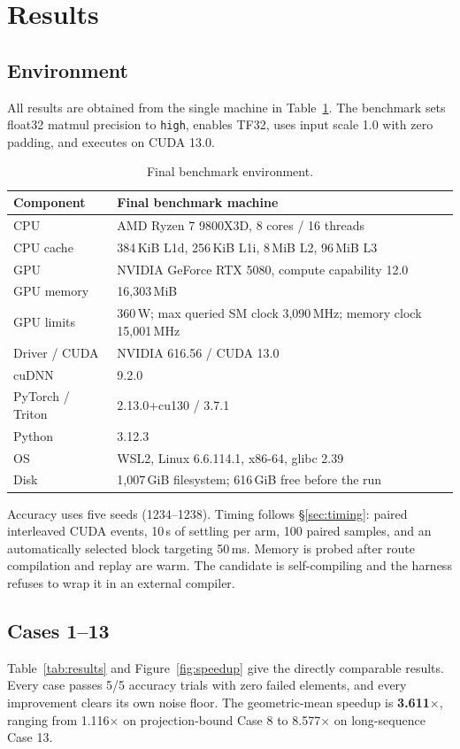 \documentclass[10pt,conference,compsoc]{IEEEtran}
\begin{document}
\section{Results}
\label{sec:results}

\subsection{Environment}
All results are obtained from the single machine in Table~\ref{tab:env}. The benchmark sets float32 matmul precision to \texttt{high}, enables TF32, uses input scale 1.0 with zero padding, and executes on CUDA 13.0.

\begin{table}[H]
\centering
\footnotesize
\begin{tabular}{p{2.1cm} p{5.4cm}}
\hline
\textbf{Component} & \textbf{Final benchmark machine} \\
\hline
CPU & AMD Ryzen 7 9800X3D, 8 cores / 16 threads \\
CPU cache & 384\,KiB L1d, 256\,KiB L1i, 8\,MiB L2, 96\,MiB L3 \\
GPU & NVIDIA GeForce RTX 5080, compute capability 12.0 \\
GPU memory & 16{,}303\,MiB \\
GPU limits & 360\,W; max queried SM clock 3{,}090\,MHz; memory clock 15{,}001\,MHz \\
Driver / CUDA & NVIDIA 616.56 / CUDA 13.0 \\
cuDNN & 9.2.0 \\
PyTorch / Triton & 2.13.0+cu130 / 3.7.1 \\
Python & 3.12.3 \\
OS & WSL2, Linux 6.6.114.1, x86-64, glibc 2.39 \\
Disk & 1{,}007\,GiB filesystem; 616\,GiB free before the run \\
\hline
\end{tabular}
\vspace{6pt}
\caption{Final benchmark environment.}
\label{tab:env}
\end{table}

Accuracy uses five seeds (1234--1238). Timing follows \S\ref{sec:timing}: paired interleaved CUDA events, 10\,s of settling per arm, 100 paired samples, and an automatically selected block targeting 50\,ms. Memory is probed after route compilation and replay are warm. The candidate is self-compiling and the harness refuses to wrap it in an external compiler.

\subsection{Cases 1--13}
Table~\ref{tab:results} and Figure~\ref{fig:speedup} give the directly comparable results. Every case passes 5/5 accuracy trials with zero failed elements, and every improvement clears its own noise floor. The geometric-mean speedup is \textbf{3.611$\times$}, ranging from 1.116$\times$ on projection-bound Case 8 to 8.577$\times$ on long-sequence Case 13.
\end{document}

